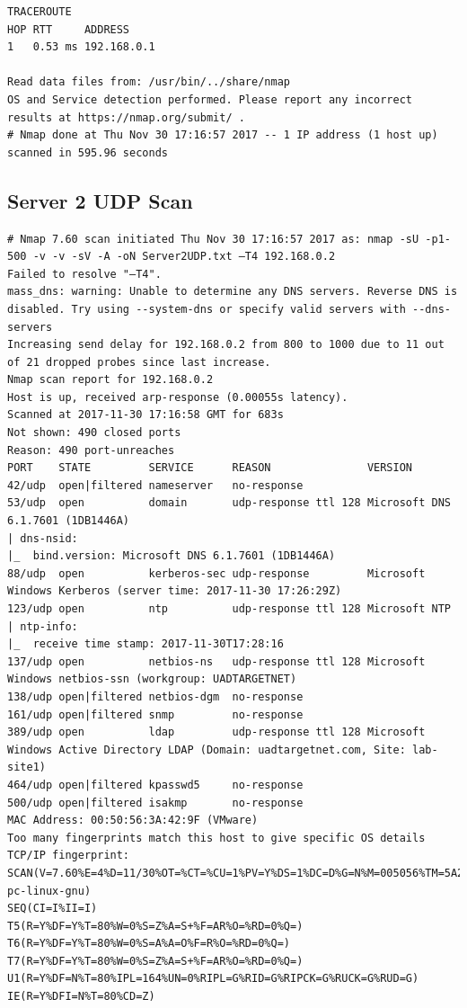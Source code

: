 \documentclass[12pt,a4paper]{article}
\begin{document}
\begin{appendices}
\begin{lstlisting}
TRACEROUTE
HOP RTT     ADDRESS
1   0.53 ms 192.168.0.1

Read data files from: /usr/bin/../share/nmap
OS and Service detection performed. Please report any incorrect results at https://nmap.org/submit/ .
# Nmap done at Thu Nov 30 17:16:57 2017 -- 1 IP address (1 host up) scanned in 595.96 seconds
		\end{lstlisting}
	\subsection{Server 2 UDP Scan}
		\begin{lstlisting}
# Nmap 7.60 scan initiated Thu Nov 30 17:16:57 2017 as: nmap -sU -p1-500 -v -v -sV -A -oN Server2UDP.txt –T4 192.168.0.2
Failed to resolve "–T4".
mass_dns: warning: Unable to determine any DNS servers. Reverse DNS is disabled. Try using --system-dns or specify valid servers with --dns-servers
Increasing send delay for 192.168.0.2 from 800 to 1000 due to 11 out of 21 dropped probes since last increase.
Nmap scan report for 192.168.0.2
Host is up, received arp-response (0.00055s latency).
Scanned at 2017-11-30 17:16:58 GMT for 683s
Not shown: 490 closed ports
Reason: 490 port-unreaches
PORT    STATE         SERVICE      REASON               VERSION
42/udp  open|filtered nameserver   no-response
53/udp  open          domain       udp-response ttl 128 Microsoft DNS 6.1.7601 (1DB1446A)
| dns-nsid:
|_  bind.version: Microsoft DNS 6.1.7601 (1DB1446A)
88/udp  open          kerberos-sec udp-response         Microsoft Windows Kerberos (server time: 2017-11-30 17:26:29Z)
123/udp open          ntp          udp-response ttl 128 Microsoft NTP
| ntp-info:
|_  receive time stamp: 2017-11-30T17:28:16
137/udp open          netbios-ns   udp-response ttl 128 Microsoft Windows netbios-ssn (workgroup: UADTARGETNET)
138/udp open|filtered netbios-dgm  no-response
161/udp open|filtered snmp         no-response
389/udp open          ldap         udp-response ttl 128 Microsoft Windows Active Directory LDAP (Domain: uadtargetnet.com, Site: lab-site1)
464/udp open|filtered kpasswd5     no-response
500/udp open|filtered isakmp       no-response
MAC Address: 00:50:56:3A:42:9F (VMware)
Too many fingerprints match this host to give specific OS details
TCP/IP fingerprint:
SCAN(V=7.60%E=4%D=11/30%OT=%CT=%CU=1%PV=Y%DS=1%DC=D%G=N%M=005056%TM=5A203FB5%P=i686-pc-linux-gnu)
SEQ(CI=I%II=I)
T5(R=Y%DF=Y%T=80%W=0%S=Z%A=S+%F=AR%O=%RD=0%Q=)
T6(R=Y%DF=Y%T=80%W=0%S=A%A=O%F=R%O=%RD=0%Q=)
T7(R=Y%DF=Y%T=80%W=0%S=Z%A=S+%F=AR%O=%RD=0%Q=)
U1(R=Y%DF=N%T=80%IPL=164%UN=0%RIPL=G%RID=G%RIPCK=G%RUCK=G%RUD=G)
IE(R=Y%DFI=N%T=80%CD=Z)


\end{lstlisting}
\end{appendices}
\end{document}
